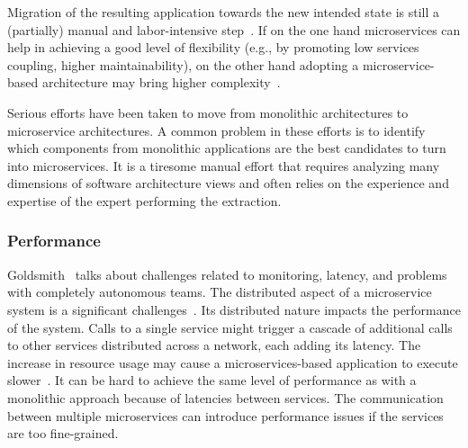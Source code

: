 Migration of the resulting application towards the new intended state is still a (partially) manual and labor-intensive step~\cite{overeem2018}. If on the one hand microservices can help in achieving a good level of flexibility (e.g., by promoting low services coupling, higher maintainability), on the other hand adopting a microservice-based architecture may bring higher complexity~\cite{Difrancesco2017}. %


Serious efforts have been taken to move from monolithic architectures to microservice architectures. A common problem in these efforts is to identify which components from monolithic applications are the best candidates to turn into microservices. It is a tiresome manual effort that requires analyzing many dimensions of software architecture views and often relies on the experience and expertise of the expert performing the extraction\cite{Kamimura2018, selmadji2020}.

\subsubsection{Performance}%

Goldsmith~\cite{Kevin2015} talks about challenges related to monitoring, latency, and problems with completely autonomous teams. The distributed aspect of a microservice system is a significant challenges~\cite{Matt2016}. Its distributed nature impacts the performance of the system. Calls to a single service might trigger a cascade of additional calls to other services distributed across a network, each adding its latency. The increase in resource usage may cause a microservices-based application to execute slower~\cite{Etsy, Netflix}. It can be hard to achieve the same level of performance as with a monolithic approach because of latencies between services. The communication between multiple microservices can introduce performance issues if the services are too fine-grained.  

